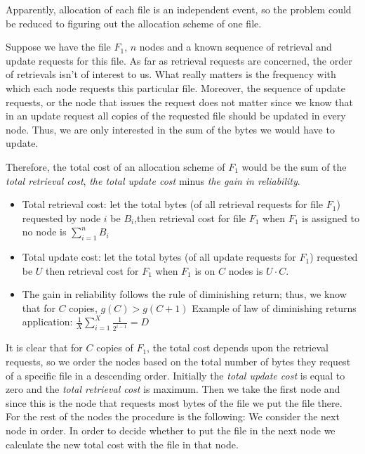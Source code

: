 Apparently, allocation of each file is an independent event, so the problem could be reduced to figuring out the allocation scheme of one file.

Suppose we have the file $F_1$, $n$ nodes and a known sequence of retrieval and update requests for this file. As far as retrieval requests are concerned, the order of retrievals isn't of interest to us. What really matters is the frequency with which each node requests this particular file. Moreover, the sequence of update requests, or the node that issues the request does not matter since we know that in an update request all copies of the requested file should be updated in every node. Thus, we are only interested in the sum of the bytes we would have to update.

Therefore, the total cost of an allocation scheme of $F_1$ would be the sum of the \textit{total retrieval cost}, \textit{the total update cost} minus \textit{the gain in reliability}.

\begin{itemize}
  \item Total retrieval cost: let the total bytes (of all retrieval requests for file $F_1$) requested by node $i$ be $B_i$,then retrieval cost for file $F_1$ when $F_1$ is assigned to no node is $ \sum_{i=1}^{n} B_i $

  \item Total update cost: let the total bytes (of all update requests for $F_1$) requested be $U$ then retrieval cost for $F_1$ when $F_1$ is on $C$ nodes is $U \cdot C$.

  \item The gain in reliability follows the rule of diminishing return; thus, we know that for $C$ copies, $g(C) > g(C+1)$ Example of law of diminishing returns application: $ \frac{1}{X}\sum_{i=1}^{X}\frac{1}{2^{i-1}} = D$
\end{itemize}

It is clear that for $C$ copies of $F_1$, the total cost depends upon the retrieval requests, so we order the nodes based on the total number of bytes they request of a specific file in a descending order. Initially the \textit{total update cost} is equal to zero and the \textit{total retrieval cost} is maximum. Then we take the first node and since this is the node that requests most bytes of the file we put the file there. For the rest of the nodes the procedure is the following: We consider the next node in order. In order to decide whether to put the file in the next node we calculate the new total cost with the file in that node.

